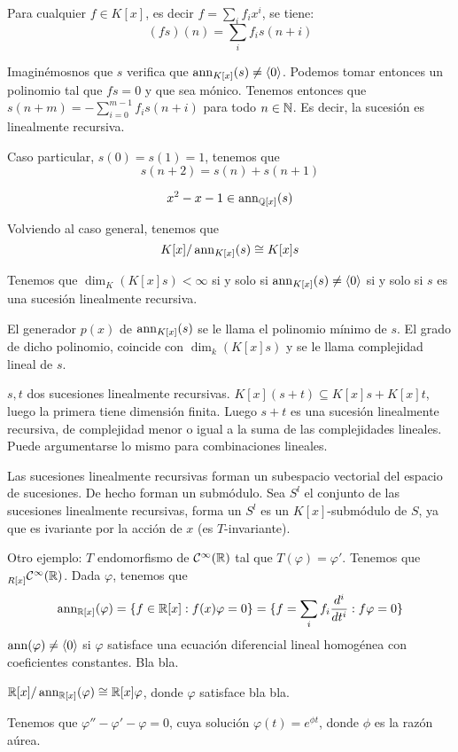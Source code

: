 Para cualquier \(f\in K[x]\), es decir \(f=\sum_i f_i x^i\), se tiene:
\[
  (fs)(n)=\sum_i f_i s(n+i)
\]

Imaginémosnos que \(s\) verifica que \(\operatorname{ann}_{K[x]}(s)\neq\langle0\rangle\).
Podemos tomar entonces un polinomio tal que \(fs = 0\) y que sea mónico.
Tenemos entonces que \(s(n+m)=-\sum_{i=0}^{m-1} f_i s(n+i)\)
para todo \(n\in\mathbb{N}\). Es decir, la sucesión es linealmente recursiva.

Caso particular, \(s(0)=s(1)=1\), tenemos que
\[
  s(n+2)=s(n)+s(n+1)
\]

\[
  x^2-x-1\in\operatorname{ann}_{\mathbb{Q}[x]}(s)
\]

Volviendo al caso general, tenemos que
\[
  K[x]/\operatorname{ann}_{K[x]}(s)\cong K[x]s
\]

Tenemos que \(\dim_{K}(K[x]s)<\infty\) si y solo si
\(\operatorname{ann}_{K[x]}(s)\neq\langle0\rangle\) si y solo si
\(s\) es una sucesión linealmente recursiva.

El generador \(p(x)\) de \(\operatorname{ann}_{K[x]}(s)\) se le llama el polinomio
mínimo de \(s\). El grado de dicho polinomio, coincide con
\(\dim_{k}(K[x]s)\) y se le llama complejidad lineal de \(s\).

\(s,t\) dos sucesiones linealmente recursivas.
\(K[x](s+t)\subseteq K[x]s+K[x]t\), luego la primera tiene dimensión finita.
Luego \(s+t\) es una sucesión linealmente recursiva, de complejidad menor
o igual a la suma de las complejidades lineales.
Puede argumentarse lo mismo para combinaciones lineales.

Las sucesiones linealmente recursivas forman un subespacio vectorial
del espacio de sucesiones. De hecho forman un submódulo. Sea
\(S^l\) el conjunto de las sucesiones linealmente recursivas, forma
un \(S^l\) es un \(K[x]\)-submódulo de \(S\), ya que es ivariante por la
acción de \(x\) (es \(T\)-invariante).

Otro ejemplo: \(T\) endomorfismo de \(\mathcal{C}^\infty(\mathbb{R})\) tal que
\(T(\varphi)=\varphi'\). Tenemos que
\(\prescript{}{R[x]}{\mathcal{C}^\infty(\mathbb{R})}\). Dada \(\varphi\),
tenemos que
\[
  \operatorname{ann}_{\mathbb{R}[x]}(\varphi)=\{f\in\mathbb{R}[x]: f(x)\varphi=0\}
  =\{f=\sum_i f_i\frac{d^i}{dt^i}: f\varphi=0\}
\]
\(\operatorname{ann}(\varphi)\neq\langle 0\rangle\) si \(\varphi\) satisface una ecuación
diferencial lineal homogénea con coeficientes constantes. Bla bla.

\(\mathbb{R}[x]/\operatorname{ann}_{\mathbb{R}[x]}(\varphi)\cong \mathbb{R}[x]\varphi\), donde \(\varphi\)
satisface bla bla.

Tenemos que \(\varphi''-\varphi'-\varphi=0\), cuya solución
\(\varphi(t)=e^{\phi t}\), donde \(\phi\) es la razón aúrea.
